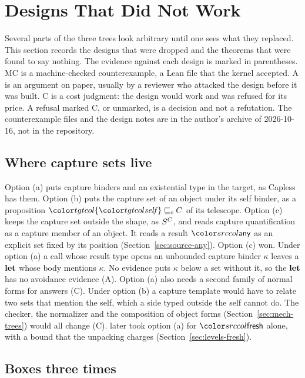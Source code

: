 \section{Designs That Did Not Work}\label{sec:history}
\mathplain

Several parts of the three trees look arbitrary until one sees what they replaced. This section records the designs that were dropped and the theorems that were found to say nothing. The evidence against each design is marked in parentheses. MC is a machine-checked counterexample, a Lean file that the kernel accepted. A is an argument on paper, usually by a reviewer who attacked the design before it was built. C is a cost judgment: the design would work and was refused for its price. A refusal marked C, or unmarked, is a decision and not a refutation. The counterexample files and the design notes are in the author's archive of 2026-10-16, not in the repository.

\subsection{Where capture sets live}

Option (a) puts capture binders and an existential type in the target, as Capless has them. Option (b) puts the capture set of an object under its self binder, as a proposition $\plec{\cset{\self}}{C}$ of its telescope. Option (c) keeps the capture set outside the shape, as $S^{C}$, and reads capture quantification as a capture member of an object. It reads a result $\cany$ as an explicit set fixed by its position (Section~\ref{sec:source-any}). Option (c) won. Under option (a) a call whose result type opens an unbounded capture binder $\kappa$ leaves a $\mathbf{let}$ whose body mentions $\kappa$. No evidence puts $\kappa$ below a set without it, so the $\mathbf{let}$ has no avoidance evidence (A). Option (a) also needs a second family of normal forms for answers (C). Under option (b) a capture template would have to relate two sets that mention the self, which a side typed outside the self cannot do. The checker, the normalizer and the composition of object forms (Section~\ref{sec:mech-trees}) would all change (C). \treeCC later took option (a) for $\cfresh$ alone, with a bound that the unpacking charges (Section~\ref{sec:levels-fresh}).

\subsection{Boxes three times}

